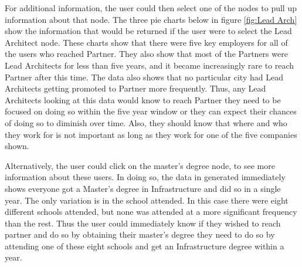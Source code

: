 For additional information, the user could then select one of the nodes to pull
up information about that node.  The three pie charts below in figure
\ref{fig:Lead Arch} show the information that would be returned if the user
were to select the Lead Architect node.  These charts show that there were five
key employers for all of the users who reached Partner.  They also show that
most of the Partners were Lead Architects for less than five years, and it
became increasingly rare to reach Partner after this time.  The data also shows
that no particular city had Lead Architects getting promoted to Partner more
frequently.  Thus, any Lead Architects looking at this data would know to reach
Partner they need to be focused on doing so within the five year window or they
can expect their chances of doing so to diminish over time.  Also, they should
know that where and who they work for is not important as long as they work for
one of the five companies shown.

Alternatively, the user could click on the master's degree node, to see more
information about these users.  In doing so, the data in generated immediately
shows everyone got a Master's degree in Infrastructure and did so in a single
year.  The only variation is in the school attended.  In this case there were
eight different schools attended, but none was attended at a more significant
frequency than the rest.  Thus the user could immediately know if they wished to
reach partner and do so by obtaining their master's degree they need to do so by
attending one of these eight schools and get an Infrastructure degree within a
year.


